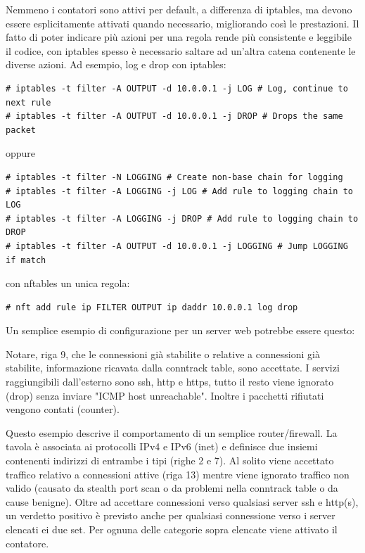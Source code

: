 Nemmeno i contatori sono attivi per default, a differenza di iptables, ma
devono essere esplicitamente attivati quando necessario, migliorando
cos\`i le prestazioni. Il fatto di poter indicare pi\`u azioni per una regola
rende pi\`u consistente e leggibile il codice, con
iptables spesso è necessario saltare ad un'altra catena contenente le diverse
azioni. Ad esempio, log e drop con iptables:

\begin{lstlisting}
# iptables -t filter -A OUTPUT -d 10.0.0.1 -j LOG # Log, continue to next rule
# iptables -t filter -A OUTPUT -d 10.0.0.1 -j DROP # Drops the same packet
\end{lstlisting}
oppure 
\begin{lstlisting}
# iptables -t filter -N LOGGING # Create non-base chain for logging
# iptables -t filter -A LOGGING -j LOG # Add rule to logging chain to LOG
# iptables -t filter -A LOGGING -j DROP # Add rule to logging chain to DROP
# iptables -t filter -A OUTPUT -d 10.0.0.1 -j LOGGING # Jump LOGGING if match
\end{lstlisting}
\noindent con nftables un unica regola:
\begin{lstlisting}
# nft add rule ip FILTER OUTPUT ip daddr 10.0.0.1 log drop
\end{lstlisting}

\noindent Un semplice esempio di configurazione per un server web potrebbe essere
questo:



\noindent Notare, riga 9, che le connessioni già stabilite o relative a
connessioni già stabilite, informazione ricavata dalla conntrack table,
sono accettate.
I servizi raggiungibili dall'esterno sono ssh, http e https, tutto il resto
viene ignorato (drop) senza inviare "ICMP host unreachable". Inoltre i
pacchetti rifiutati vengono contati (counter).

\begin{minipage}{\linewidth}

\end{minipage}

\noindent Questo esempio descrive il comportamento di un semplice
router/firewall. La tavola è associata ai protocolli IPv4 e IPv6 (inet) e
definisce due insiemi contenenti indirizzi di entrambe i tipi (righe 2 e 7).
Al solito viene accettato traffico relativo a connessioni attive (riga 13)
mentre viene ignorato traffico non valido (causato da stealth port scan o da
problemi nella conntrack table o da cause benigne).
Oltre ad accettare connessioni verso qualsiasi server ssh e http(s), un
verdetto positivo è previsto anche per qualsiasi connessione verso i server
elencati ei due set.
Per ognuna delle categorie sopra elencate viene attivato il contatore.


\chapter{}

